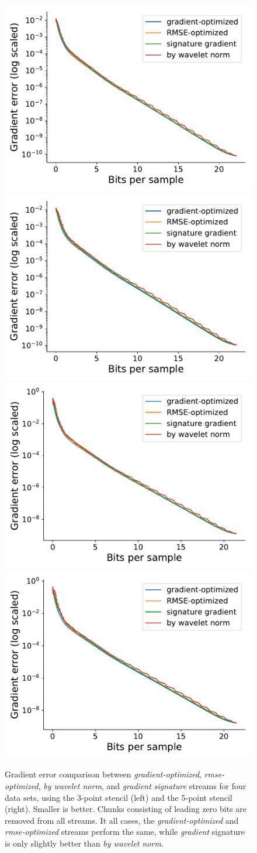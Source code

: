 \begin{figure}
	{\includegraphics[width=0.48\linewidth]{img/gradient-laplacian/miranda-diffusivity-gradient-stencil-3.pdf}}
	{\includegraphics[width=0.48\linewidth]{img/gradient-laplacian/miranda-diffusivity-gradient-stencil-5.pdf}}
	{\includegraphics[width=0.48\linewidth]{img/gradient-laplacian/miranda-velocityz-gradient-stencil-3.pdf}}
	{\includegraphics[width=0.48\linewidth]{img/gradient-laplacian/miranda-velocityz-gradient-stencil-5.pdf}}
	\caption{Gradient error comparison between \emph{gradient-optimized}, \emph{rmse-optimized},
	\emph{by wavelet norm}, and \emph{gradient signature} streams for four data sets, using the
	3-point stencil (left) and the 5-point stencil (right). Smaller is better. Chunks consisting of
	leading zero bits are removed from all streams. It all cases, the \emph{gradient-optimized} and
	\emph{rmse-optimized} streams perform the same, while \emph{gradient} signature is only slightly
	better than \emph{by wavelet norm}.}
	\label{fig:gradient-error-comparison}
\end{figure}

